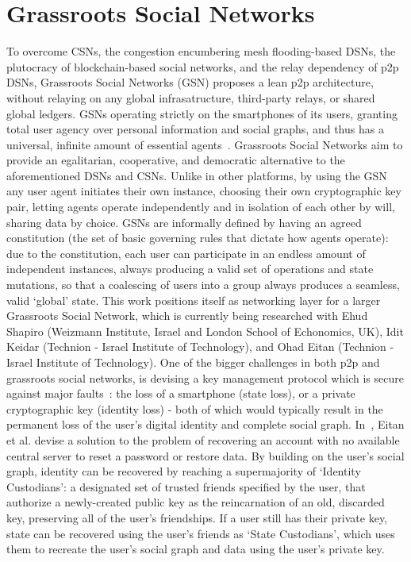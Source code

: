 \section{Grassroots Social Networks}
\label{sec:gsn}
To overcome CSNs, the congestion encumbering mesh flooding-based DSNs, the plutocracy of blockchain-based social networks, and the relay dependency of p2p DSNs, Grassroots Social Networks (GSN) proposes a lean p2p architecture, without relaying on any global infrasatructure, third-party relays, or shared global ledgers. GSNs operating strictly on the smartphones of its users, granting total user agency over personal information and social graphs, and thus has a universal, infinite amount of essential agents~\cite{Shapiro2026Platforms}.
Grassroots Social Networks aim to provide an egalitarian, cooperative, and democratic alternative to the aforementioned DSNs and CSNs. Unlike in other platforms, by using the GSN any user agent initiates their own instance, choosing their own cryptographic key pair, letting agents operate independently and in isolation of each other by will, sharing data by choice. GSNs are informally defined by having an agreed constitution (the set of basic governing rules that dictate how agents operate): due to the constitution, each user can participate in an endless amount of independent instances, always producing a valid set of operations and state mutations, so that a coalescing of users into a group always produces a seamless, valid `global' state.
This work positions itself as networking layer for a larger Grassroots Social Network, which is currently being researched with Ehud Shapiro (Weizmann Institute, Israel and London School of Echonomics, UK), Idit Keidar (Technion - Israel Institute of Technology), and Ohad Eitan (Technion - Israel Institute of Technology).
One of the bigger challenges in both p2p and grassroots social networks, is devising a key management protocol which is secure against major faults~\cite{Inyangson2025}: the loss of a smartphone (state loss), or a private cryptographic key (identity loss) - both of which would typically result in the permanent loss of the user's digital identity and complete social graph. 
In~\cite{Eitan2026}, Eitan et al. devise a solution to the problem of recovering an account with no available central server to reset a password or restore data. By building on the user's social graph, identity can be recovered by reaching a supermajority of `Identity Custodians': a designated set of trusted friends specified by the user, that authorize a newly-created public key as the reincarnation of an old, discarded key, preserving all of the user's friendships. If a user still has their private key, state can be recovered using the user's friends as `State Custodians', which uses them to recreate the user's social graph and data using the user's private key.
